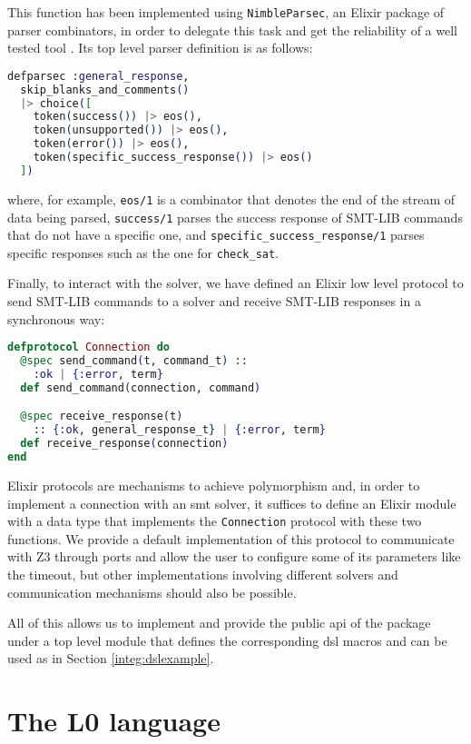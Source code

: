 This function has been implemented using \verb|NimbleParsec|, an Elixir package
of parser combinators, in order to delegate this task and get the reliability of
a well tested tool \citep{NimbleDocs}. Its top level parser definition is as
follows:

\begin{lstlisting}[language=elixir,numbers=none,frame=none]
defparsec :general_response,
  skip_blanks_and_comments()
  |> choice([
    token(success()) |> eos(),
    token(unsupported()) |> eos(),
    token(error()) |> eos(),
    token(specific_success_response()) |> eos()
  ])
\end{lstlisting}

where, for example, \verb|eos/1| is a combinator that denotes the end of the 
stream of data being parsed, \verb|success/1| parses the success response of
SMT-LIB commands that do not have a specific one, and
\verb|specific_success_response/1| parses specific responses such as the one for
\verb|check_sat|.

Finally, to interact with the solver, we have defined an Elixir low level
protocol to send SMT-LIB commands to a solver and receive SMT-LIB responses in a
synchronous way:

\begin{lstlisting}[language=elixir,numbers=none,frame=none]
defprotocol Connection do
  @spec send_command(t, command_t) :: 
    :ok | {:error, term}
  def send_command(connection, command)

  @spec receive_response(t) 
    :: {:ok, general_response_t} | {:error, term}
  def receive_response(connection)
end
\end{lstlisting}

Elixir protocols are mechanisms to achieve polymorphism and, in order to
implement a connection with an \acrshort{smt} solver, it suffices to define an
Elixir module with a data type that implements the \verb|Connection| protocol
with these two functions. We provide a default implementation of this protocol
to communicate with Z3 through ports and allow the user to configure some of its
parameters like the timeout, but other implementations involving different
solvers and communication mechanisms should also be possible.

All of this allows us to implement and provide the public \gls{api} of the 
package under a top level module that defines the corresponding \gls{dsl} macros
and can be used as in Section \ref{integ:dslexample}.

\section{The L0 language}

